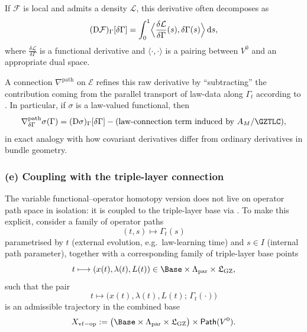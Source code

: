 \documentclass[11pt]{book}
\theoremstyle{plain}
\theoremstyle{definition}
\newcommand{\GZLS}{\ensuremath{\mathfrak{L}_{\mathrm{GZ}}}}       \newcommand{\GZLT}{\ensuremath{M_{!w}}}                           \newcommand{\GZLOC}{\ensuremath{A_M}}                             \newcommand{\GZLCurv}{\ensuremath{\mathcal{F}_{\mathrm{law}}}}
\begin{document}
If $\mathcal{F}$ is local and admits a density $\mathcal{L}$, this
derivative often decomposes as
\[
   (\mathrm{D}\mathcal{F})_\Gamma[\delta\Gamma]
   =
   \int_0^1
     \Bigl\langle
       \frac{\delta\mathcal{L}}{\delta\Gamma}(s),
       \delta\Gamma(s)
     \Bigr\rangle
   \,\mathrm{d}s,
\]
where $\frac{\delta\mathcal{L}}{\delta\Gamma}$ is a functional
derivative and $\langle\cdot,\cdot\rangle$ is a pairing between
$V^0$ and an appropriate dual space.

A connection $\nabla^{\mathrm{path}}$ on $\mathcal{E}$ refines this
raw derivative by “subtracting” the contribution coming from the
parallel transport of law-data along $\Gamma_t$ according to \GZTLC.
In particular, if $\sigma$ is a law-valued functional, then
\[
   \nabla^{\mathrm{path}}_{\delta\Gamma}\sigma(\Gamma)
   =
   (\mathrm{D}\sigma)_\Gamma[\delta\Gamma]
   - \text{(law-connection term induced by \GZLOC/\GZTLC)},
\]
in exact analogy with how covariant derivatives differ from ordinary
derivatives in bundle geometry.



\subsubsection*{(e) Coupling with the triple-layer connection \texorpdfstring{\GZTLC}{GZ-TLC}}

The variable functional–operator homotopy version does not live on
operator path space in isolation: it is coupled to the triple-layer
base via \GZTLC. To make this explicit, consider a family of operator
paths
\[
   (t,s)\longmapsto \Gamma_{t}(s)
\]
parametrised by $t$ (external evolution, e.g.\ law-learning time) and
$s\in I$ (internal path parameter), together with a corresponding
family of triple-layer base points
\[
   t\longmapsto
   (x(t),\lambda(t),L(t))
   \in \Base\times\Lambda_{\mathrm{par}}\times\GZLS,
\]
such that the pair
\[
   t\longmapsto
   \bigl(
     x(t),\lambda(t),L(t);\,
     \Gamma_t(\cdot)
   \bigr)
\]
is an admissible trajectory in the combined base
\[
   X_{\mathrm{vf-op}}
   :=
   \bigl(\Base\times\Lambda_{\mathrm{par}}\times\GZLS\bigr)
   \times \mathsf{Path}(V^0).
\]
\end{document}

